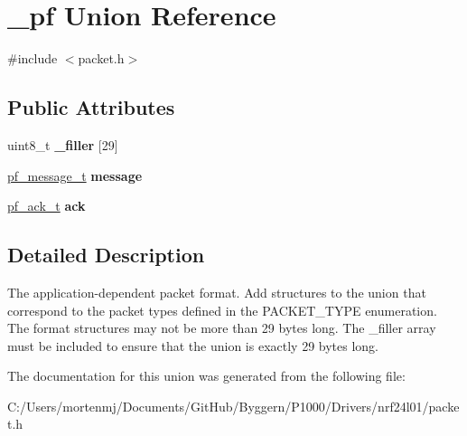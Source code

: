 \hypertarget{union__pf}{\section{\-\_\-pf Union Reference}
\label{union__pf}
}


{\ttfamily \#include $<$packet.\-h$>$}

\subsection*{Public Attributes}
\begin{DoxyCompactItemize}
\item 
\hypertarget{union__pf_a7556ee5632156b64d9988ef430770f7e}{uint8\-\_\-t {\bfseries \-\_\-filler} \mbox{[}29\mbox{]}}\label{union__pf_a7556ee5632156b64d9988ef430770f7e}

\item 
\hypertarget{union__pf_a410f7446f51b0843f7b17d4911bf19ab}{\hyperlink{struct__msg}{pf\-\_\-message\-\_\-t} {\bfseries message}}\label{union__pf_a410f7446f51b0843f7b17d4911bf19ab}

\item 
\hypertarget{union__pf_af35da1e870a768832082aad3accfcf8e}{\hyperlink{struct__ack}{pf\-\_\-ack\-\_\-t} {\bfseries ack}}\label{union__pf_af35da1e870a768832082aad3accfcf8e}

\end{DoxyCompactItemize}


\subsection{Detailed Description}
The application-\/dependent packet format. Add structures to the union that correspond to the packet types defined in the P\-A\-C\-K\-E\-T\-\_\-\-T\-Y\-P\-E enumeration. The format structures may not be more than 29 bytes long. The \-\_\-filler array must be included to ensure that the union is exactly 29 bytes long. 

The documentation for this union was generated from the following file\-:\begin{DoxyCompactItemize}
\item 
C\-:/\-Users/mortenmj/\-Documents/\-Git\-Hub/\-Byggern/\-P1000/\-Drivers/nrf24l01/packet.\-h\end{DoxyCompactItemize}
